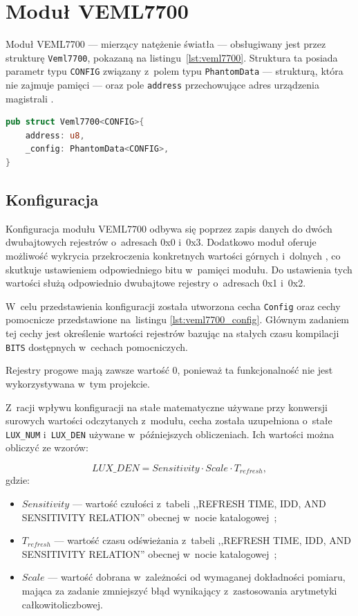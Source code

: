 \section{Moduł VEML7700}
Moduł VEML7700 --- mierzący natężenie światła --- obsługiwany jest przez 
strukturę \texttt{Veml7700}, pokazaną na listingu~\ref{lst:veml7700}. 
Struktura ta posiada parametr typu 
\texttt{CONFIG} związany z~polem typu \texttt{PhantomData} --- strukturą, która nie 
zajmuje pamięci --- oraz pole \texttt{address} przechowujące adres 
urządzenia magistrali \isqrc.

\begin{lstlisting}[language=Rust, style=colouredRust, 
    caption={Struktura \texttt{Veml7700}},
    label={lst:veml7700}
]
pub struct Veml7700<CONFIG>{
    address: u8,
    _config: PhantomData<CONFIG>,
}
\end{lstlisting}

\subsection*{Konfiguracja}
\label{section:veml7700_config}
Konfiguracja modułu VEML7700 odbywa się poprzez zapis danych do dwóch
dwubajtowych rejestrów o~adresach 0x0 i~0x3.
Dodatkowo moduł oferuje możliwość wykrycia przekroczenia konkretnych 
wartości górnych i~dolnych , co skutkuje 
ustawieniem odpowiedniego bitu w~pamięci modułu. 
Do ustawienia tych wartości służą odpowiednio 
dwubajtowe rejestry o~adresach 0x1 i~0x2.

W~celu przedstawienia konfiguracji została utworzona cecha \texttt{Config}
oraz cechy pomocnicze przedstawione na~listingu \ref{lst:veml7700_config}.
Głównym zadaniem tej cechy jest określenie wartości rejestrów 
bazując na stałych czasu kompilacji \texttt{BITS} dostępnych w~cechach
pomocniczych.

Rejestry progowe mają zawsze wartość 0, ponieważ ta 
funkcjonalność nie jest wykorzystywana w~tym projekcie.

Z~racji wpływu konfiguracji na stałe matematyczne używane przy konwersji
surowych wartości odczytanych z~modułu, cecha została uzupełniona o~stałe 
\texttt{LUX\_NUM} i~\texttt{LUX\_DEN} używane w~późniejszych obliczeniach.
Ich wartości można obliczyć ze wzorów:

\begin{equation}
    LUX\_DEN = Sensitivity \cdot Scale \cdot T_{refresh},
    \label{eq:veml7700_lux_den}
\end{equation}
\noindent gdzie:
\begin{itemize}
    \item $Sensitivity$ --- wartość czułości z~tabeli ,,REFRESH 
    TIME, IDD, AND SENSITIVITY RELATION'' obecnej w~nocie 
    katalogowej~\cite{veml7700_datasheet};
    \item $T_{refresh}$ --- wartość czasu odświeżania z~tabeli 
    ,,REFRESH TIME, IDD, AND SENSITIVITY RELATION'' obecnej w~nocie 
    katalogowej~\cite{veml7700_datasheet};
    \item $Scale$ --- wartość dobrana w~zależności od wymaganej dokładności
    pomiaru, mająca za zadanie zmniejszyć błąd wynikający z~zastosowania
    arytmetyki całkowitoliczbowej.
\end{itemize}

